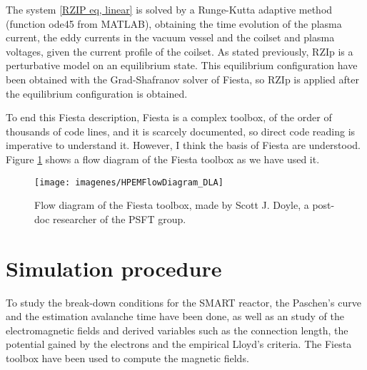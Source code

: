 \documentclass[a4paper,12pt,oneside]{book}
\begin{document}
The system \eqref{RZIP eq, linear} is solved by a Runge-Kutta adaptive method (function ode45 from MATLAB), obtaining the time evolution of the plasma current, the eddy currents in the vacuum vessel and the coilset and plasma voltages, given the current profile of the coilset. As stated previously, RZIp is a perturbative model on an equilibrium state. This equilibrium configuration have been obtained with the Grad-Shafranov solver of Fiesta, so RZIp is applied after the equilibrium configuration is obtained.

To end this Fiesta description, Fiesta is a complex toolbox, of the order of thousands of code lines, and it is scarcely documented, so direct code reading is imperative to understand it. However, I think the basis of Fiesta are understood. Figure \ref{fig_diagram_Fiesta} shows a flow diagram of the Fiesta toolbox as we have used it.


\begin{figure}[htbp]
\centering
\texttt{[image: imagenes/HPEMFlowDiagram\_DLA]}
\caption{Flow diagram of the Fiesta toolbox, made by Scott J. Doyle, a post-doc researcher of the PSFT group.}
\label{fig_diagram_Fiesta}
\end{figure}



\chapter{Simulation procedure}
\label{chapter_simu}

To study the break-down conditions for the SMART reactor, the Paschen's curve and the estimation avalanche time have been done, as well as an study of the electromagnetic fields and derived variables such as the connection length, the potential gained by the electrons and the empirical Lloyd's criteria. The Fiesta toolbox have been used to compute the magnetic fields.
\end{document}
